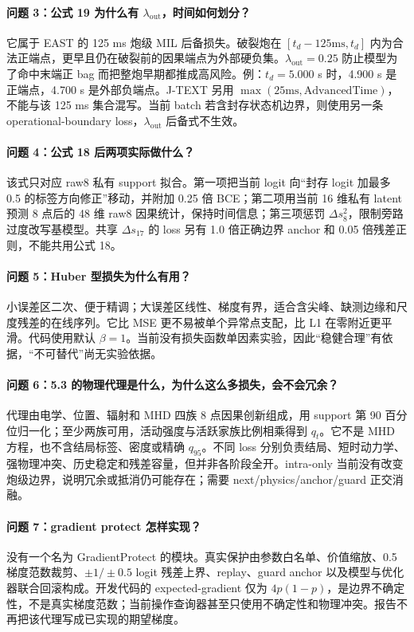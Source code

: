 \documentclass[11pt,a4paper]{article}
\begin{document}
\paragraph{问题 3：公式 19 为什么有 \(\lambda_{\mathrm{out}}\)，时间如何划分？}
它属于 EAST 的 125 ms 炮级 MIL 后备损失。破裂炮在 \([t_d-125\mathrm{ms},t_d]\) 内为合法正端点，更早且仍在破裂前的因果端点为外部硬负集。\(\lambda_{\mathrm{out}}=0.25\) 防止模型为了命中末端正 bag 而把整炮早期都推成高风险。例：\(t_d=5.000\) s 时，4.900 s 是正端点，4.700 s 是外部负端点。J-TEXT 另用 \(\max(25\mathrm{ms},\mathrm{AdvancedTime})\)，不能与该 125 ms 集合混写。当前 batch 若含封存状态机边界，则使用另一条 operational-boundary loss，\(\lambda_{\mathrm{out}}\) 后备式不生效。

\paragraph{问题 4：公式 18 后两项实际做什么？}
该式只对应 raw8 私有 support 拟合。第一项把当前 logit 向“封存 logit 加最多 0.5 的标签方向修正”移动，并附加 0.25 倍 BCE；第二项用当前 16 维私有 latent 预测 8 点后的 48 维 raw8 因果统计，保持时间信息；第三项惩罚 \(\Delta s_8^2\)，限制旁路过度改写基模型。共享 \(\Delta s_{17}\) 的 loss 另有 1.0 倍正确边界 anchor 和 0.05 倍残差正则，不能共用公式 18。

\paragraph{问题 5：Huber 型损失为什么有用？}
小误差区二次、便于精调；大误差区线性、梯度有界，适合含尖峰、缺测边缘和尺度残差的在线序列。它比 MSE 更不易被单个异常点支配，比 L1 在零附近更平滑。代码使用默认 \(\beta=1\)。当前没有损失函数单因素实验，因此“稳健合理”有依据，“不可替代”尚无实验依据。

\paragraph{问题 6：5.3 的物理代理是什么，为什么这么多损失，会不会冗余？}
代理由电学、位置、辐射和 MHD 四族 8 点因果创新组成，用 support 第 90 百分位归一化；至少两族可用，活动强度与活跃家族比例相乘得到 \(q_t\)。它不是 MHD 方程，也不含结局标签、密度或精确 \(q_{95}\)。不同 loss 分别负责结局、短时动力学、强物理冲突、历史稳定和残差容量，但并非各阶段全开。intra-only 当前没有改变炮级边界，说明冗余或抵消仍可能存在；需要 next/physics/anchor/guard 正交消融。

\paragraph{问题 7：gradient protect 怎样实现？}
没有一个名为 GradientProtect 的模块。真实保护由参数白名单、价值缩放、0.5 梯度范数裁剪、\(\pm1/\pm0.5\) logit 残差上界、replay、guard anchor 以及模型与优化器联合回滚构成。开发代码的 expected-gradient 仅为 \(4p(1-p)\)，是边界不确定性，不是真实梯度范数；当前操作查询器甚至只使用不确定性和物理冲突。报告不再把该代理写成已实现的期望梯度。
\end{document}
